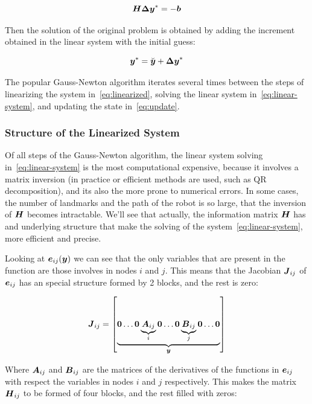 \begin{equation}
\boldsymbol{H \Delta y}^* = -\boldsymbol{b}
\label{eq:linear-system}
\end{equation}

Then the solution of the original problem is obtained by adding the increment obtained in the linear system with the initial guess:

\begin{equation}
\boldsymbol{y}^* = \breve{\boldsymbol{y}}+ \boldsymbol{\Delta y}^*
\label{eq:update}
\end{equation}

The popular Gauss-Newton algorithm iterates several times between the steps of linearizing the system in~\eqref{eq:linearized}, solving the linear system in~\eqref{eq:linear-system}, and updating the state in~\eqref{eq:update}.  

\subsubsection{Structure of the Linearized System}

Of all steps of the Gauss-Newton algorithm, the linear system solving in~\eqref{eq:linear-system} is the most computational expensive, because it involves a matrix inversion (in practice or efficient methods are used, such as QR decomposition), and its also the more prone to numerical errors. In some cases, the number of landmarks and the path of the robot is so large, that the inversion of $\boldsymbol{H}$ becomes intractable. We'll see that actually, the information matrix $\boldsymbol{H}$ has and underlying structure that make the solving of the system~\eqref{eq:linear-system}, more efficient and precise.


Looking at $\boldsymbol{e}_{ij}(\boldsymbol{y})$ we can see that the only variables that are present in the function are those involves in nodes $i$ and $j$. This means that the Jacobian $\boldsymbol{J}_{ij}$ of $\boldsymbol{e}_{ij}$ has an special structure formed by 2 blocks, and the rest is zero:

\begin{equation}
\boldsymbol{J}_{ij} = \left[ \underbrace{\boldsymbol{0} \dots \boldsymbol{0} 
    \underbrace{\boldsymbol{A}_{ij}}_{i} \boldsymbol{0} \dots \boldsymbol{0} 
    \underbrace{\boldsymbol{B}_{ij}}_{j}
    \boldsymbol{0} \dots \boldsymbol{0}}_{\boldsymbol{y}} \right] 
\end{equation}

Where $\boldsymbol{A}_{ij}$ and $\boldsymbol{B}_{ij}$ are the matrices of the derivatives of the functions in $\boldsymbol{e}_{ij}$ with respect the variables in nodes $i$ and $j$ respectively. This makes the matrix $\boldsymbol{H}_{ij}$ to be formed of four blocks, and the rest filled with zeros:

